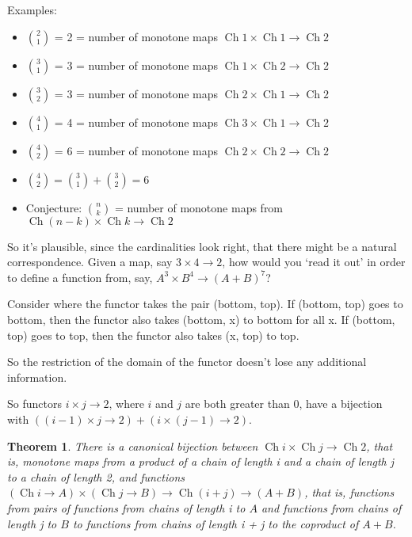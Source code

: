 \documentclass{proc-l}
\newtheorem{theorem}{Theorem}[section]
\theoremstyle{definition}
\theoremstyle{remark}
\numberwithin{equation}{section}
\begin{document}
Examples:
\begin{itemize}
    \item \({2 \choose 1}\) = 2 = number of monotone maps \(\operatorname{Ch} 1 \times \operatorname{Ch} 1 \to \operatorname{Ch} 2\)
    \item \({3 \choose 1}\) = 3 = number of monotone maps \(\operatorname{Ch} 1 \times \operatorname{Ch} 2 \to \operatorname{Ch} 2\)
    \item \({3 \choose 2}\) = 3 = number of monotone maps \(\operatorname{Ch} 2 \times \operatorname{Ch} 1 \to \operatorname{Ch} 2\)
    \item \({4 \choose 1}\) = 4 = number of monotone maps \(\operatorname{Ch} 3 \times \operatorname{Ch} 1 \to \operatorname{Ch} 2\)
    \item \({4 \choose 2}\) = 6 = number of monotone maps \(\operatorname{Ch} 2 \times \operatorname{Ch} 2 \to \operatorname{Ch} 2\)
    \item \({4 \choose 2} = {3 \choose 1} + {3 \choose 2} = 6\)

    \item Conjecture: \({n \choose k}\) = number of monotone maps from \(\operatorname{Ch} (n - k) \times \operatorname{Ch} k \to \operatorname{Ch} 2\)
\end{itemize}


So it's plausible, since the cardinalities look right, that there might be a natural correspondence. Given a map, say \(3 \times 4 \to 2\), how would you `read it out' in order to define a function from, say, \(A^3 \times B^4 \to (A + B)^7\)? 

Consider where the functor takes the pair (bottom, top). If (bottom, top) goes to bottom, then the functor also takes (bottom, x) to bottom for all x. If (bottom, top) goes to top, then the functor also takes (x, top) to top.

So the restriction of the domain of the functor doesn't lose any additional information.

So functors \(i \times j \to 2\), where \(i\) and \(j\) are both greater than 0, have a bijection with \(((i-1) \times j \to 2) + (i \times (j-1) \to 2)\).

\begin{theorem}
There is a canonical bijection between \(\operatorname{Ch} i \times \operatorname{Ch} j \to \operatorname{Ch} 2\), that is, monotone maps from a product of a chain of length i and a chain of length j to a chain of length 2, and functions \((\operatorname{Ch} i \to A) \times (\operatorname{Ch} j \to B) \to \operatorname{Ch} (i + j) \to (A + B)\),
that is, functions from pairs of functions from chains of length i to \(A\) and functions from chains of length j to \(B\) to functions from chains of length i + j to the coproduct of \(A + B\).
\end{theorem}
\end{document}
